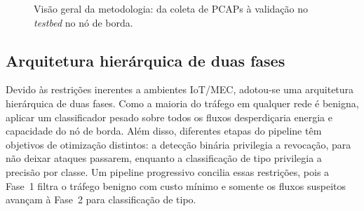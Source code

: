 \documentclass[12pt]{article}
\begin{document}
\begin{figure}[ht]
\centering
{}
\caption{Visão geral da metodologia: da coleta de PCAPs à validação no \textit{testbed} no nó de borda.}
\label{fig:metodologia}
\end{figure}

\subsection{Arquitetura hierárquica de duas fases}
\label{subsec:arquitetura}

Devido às restrições inerentes a ambientes IoT/MEC, adotou-se uma arquitetura
hierárquica de duas fases. Como a maioria do tráfego em qualquer
rede é benigna, aplicar um classificador pesado sobre todos os fluxos
desperdiçaria energia e capacidade do nó de borda. Além disso, diferentes etapas do
pipeline têm objetivos de otimização distintos: a detecção binária privilegia a
revocação, para não deixar ataques passarem, enquanto a classificação de tipo
privilegia a precisão por classe. Um pipeline progressivo concilia essas
restrições, pois a Fase~1 filtra o tráfego benigno com custo mínimo e somente os
fluxos suspeitos avançam à Fase~2 para classificação de tipo.
\end{document}
